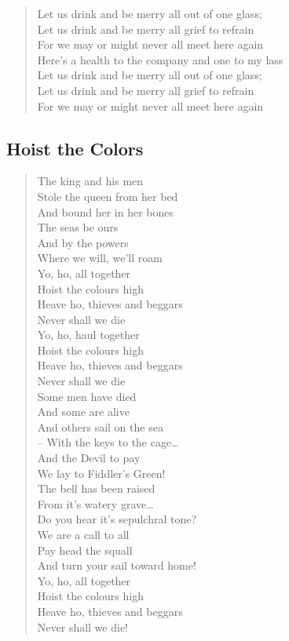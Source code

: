 \documentclass[11pt]{article}
\begin{document}
\begin{verse}
Let us drink and be merry all out of one glass;\\
Let us drink and be merry all grief to refrain\\
For we may or might never all meet here again\\
\vspace*{1em}
Here's a health to the company and one to my lass\\
Let us drink and be merry all out of one glass;\\
Let us drink and be merry all grief to refrain\\
For we may or might never all meet here again\\
\end{verse}
\clearpage
\subsection{Hoist the Colors}
\label{sec:org4579b15}
\begin{verse}
The king and his men\\
Stole the queen from her bed\\
And bound her in her bones\\
The seas be ours\\
And by the powers\\
Where we will, we'll roam\\
\vspace*{1em}
Yo, ho, all together\\
Hoist the colours high\\
Heave ho, thieves and beggars\\
Never shall we die\\
Yo, ho, haul together\\
Hoist the colours high\\
Heave ho, thieves and beggars\\
Never shall we die\\
\vspace*{1em}
Some men have died\\
And some are alive\\
And others sail on the sea\\
– With the keys to the cage\ldots{}\\
And the Devil to pay\\
We lay to Fiddler's Green!\\
\vspace*{1em}
The bell has been raised\\
From it's watery grave\ldots{}\\
Do you hear it's sepulchral tone?\\
We are a call to all\\
Pay head the squall\\
And turn your sail toward home!\\
\vspace*{1em}
Yo, ho, all together\\
Hoist the colours high\\
Heave ho, thieves and beggars\\
Never shall we die!\\
\end{verse}
\clearpage
\end{document}
